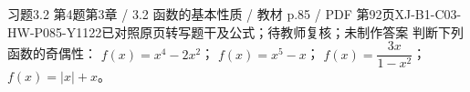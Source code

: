 \par\noindent\begin{minipage}{\linewidth}
\begin{bankitem}{习题3.2 第4题}{第3章 / 3.2 函数的基本性质 / 教材 p.85 / PDF 第92页}{XJ-B1-C03-HW-P085-Y1122}{已对照原页转写题干及公式；待教师复核；未制作答案}
判断下列函数的奇偶性：
$f(x)=x^4-2x^2$；
$f(x)=x^5-x$；
$f(x)=\dfrac{3x}{1-x^2}$；
$f(x)=|x|+x$。
\end{bankitem}
\end{minipage}\par\medskip
